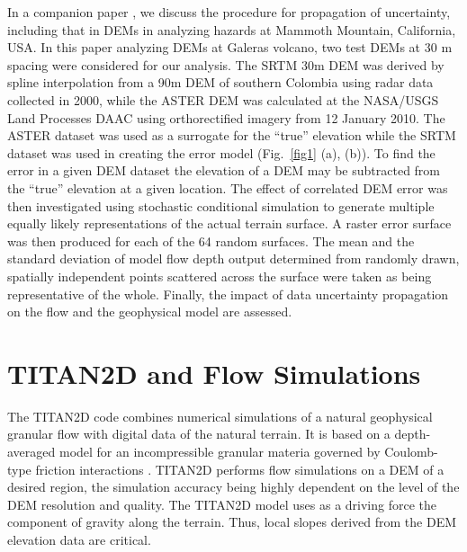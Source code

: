 \documentclass[a4paper,fleqn]{article}
\begin{document}
In a companion paper \citep{stefanescu2}, we discuss the procedure for
propagation of uncertainty, including that in DEMs in analyzing
hazards at Mammoth Mountain, California, USA.  In this paper analyzing DEMs at Galeras volcano,
 two test DEMs at 30 m spacing were considered for our analysis. The SRTM
30m DEM was derived by spline interpolation from a 90m DEM of southern
Colombia using radar data collected in 2000, while the ASTER DEM was
calculated at the NASA/USGS Land Processes DAAC using orthorectified
imagery from 12 January 2010.  The ASTER dataset was used as a
surrogate for the ``true'' elevation while the SRTM dataset was used
in creating the error model (Fig.~\ref{fig1} (a), (b)). To find the
error in a given DEM dataset the elevation of a DEM may be subtracted
from the ``true'' elevation at a given location. The effect of
correlated DEM error was then investigated using stochastic
conditional simulation to generate multiple equally likely
representations of the actual terrain surface. A raster error surface
was then produced for each of the 64 random surfaces. The mean and
the standard deviation of model flow depth output  determined from
randomly drawn, spatially independent points scattered across the
surface were taken as being representative of the whole. Finally, the impact
of data uncertainty propagation on the flow and the geophysical
model are  assessed.

\section{TITAN2D and Flow Simulations}

The TITAN2D code combines numerical simulations of a natural
geophysical granular flow with digital data of the natural terrain. It
is based on a depth-averaged model for an incompressible granular
materia governed by Coulomb-type friction interactions
\citep{Savage1989}. TITAN2D performs flow simulations on a DEM of a
desired region, the simulation accuracy being highly dependent on the
level of the DEM resolution and quality. The TITAN2D model uses as a
driving force the component of gravity along the terrain. Thus, local
slopes derived from the DEM elevation data are critical.
\end{document}
